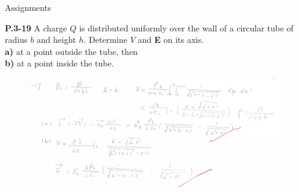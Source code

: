 \documentclass[xcolor={dvipsnames}]{beamer}
\begin{document}
\begin{frame}{Assignments}
\begin{block}{\textbf{P.3-19}}
A charge $Q$ is distributed uniformly over the wall of a circular tube of radius $b$ and height $h$. Determine $V$ and \textbf{E} on its axis.\\
\textbf{a)} at a point outside the tube, then\\
\textbf{b)} at a point inside the tube.\\
\end{block}
\pause
\begin{figure}[H]
	\centering
	\includegraphics[width=0.9\linewidth]{2_9.png}
\end{figure}
\end{frame}
\end{document}
